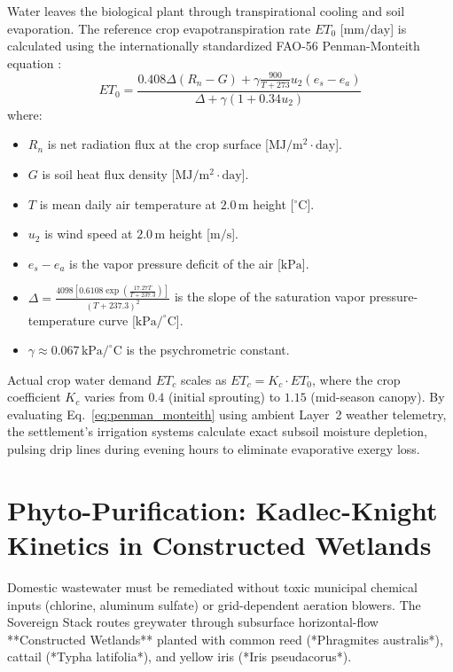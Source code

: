 Water leaves the biological plant through transpirational cooling and soil evaporation. The reference crop evapotranspiration rate $ET_0$ [$\mathrm{mm/day}$] is calculated using the internationally standardized FAO-56 Penman-Monteith equation \cite{allen1998crop}:
\begin{equation}
ET_0 = \frac{0.408 \Delta (R_n - G) + \gamma \frac{900}{T + 273} u_2 (e_s - e_a)}{\Delta + \gamma(1 + 0.34 u_2)}
\label{eq:penman_monteith}
\end{equation}
where:
\begin{itemize}
    \item $R_n$ is net radiation flux at the crop surface [$\mathrm{MJ/m^2\cdot day}$].
    \item $G$ is soil heat flux density [$\mathrm{MJ/m^2\cdot day}$].
    \item $T$ is mean daily air temperature at $2.0\,\mathrm{m}$ height [$^\circ\mathrm{C}$].
    \item $u_2$ is wind speed at $2.0\,\mathrm{m}$ height [$\mathrm{m/s}$].
    \item $e_s - e_a$ is the vapor pressure deficit of the air [$\mathrm{kPa}$].
    \item $\Delta = \frac{4098 \left[ 0.6108 \exp\left(\frac{17.27 T}{T + 237.3}\right) \right]}{(T + 237.3)^2}$ is the slope of the saturation vapor pressure-temperature curve [$\mathrm{kPa/^\circ C}$].
    \item $\gamma \approx 0.067\,\mathrm{kPa/^\circ C}$ is the psychrometric constant.
\end{itemize}

Actual crop water demand $ET_c$ scales as $ET_c = K_c \cdot ET_0$, where the crop coefficient $K_c$ varies from $0.4$ (initial sprouting) to $1.15$ (mid-season canopy). By evaluating Eq.~\eqref{eq:penman_monteith} using ambient Layer~2 weather telemetry, the settlement's irrigation systems calculate exact subsoil moisture depletion, pulsing drip lines during evening hours to eliminate evaporative exergy loss.

\section{Phyto-Purification: Kadlec-Knight Kinetics in Constructed Wetlands}

Domestic wastewater must be remediated without toxic municipal chemical inputs (chlorine, aluminum sulfate) or grid-dependent aeration blowers. The Sovereign Stack routes greywater through subsurface horizontal-flow **Constructed Wetlands** planted with common reed (*Phragmites australis*), cattail (*Typha latifolia*), and yellow iris (*Iris pseudacorus*).

